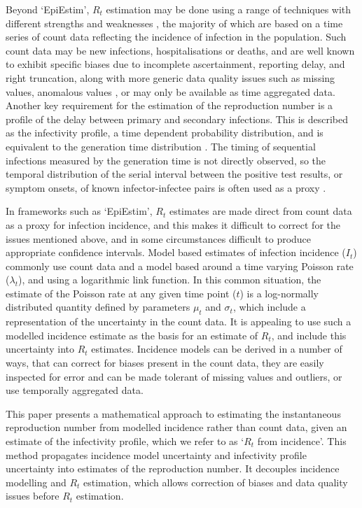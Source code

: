 \documentclass[10pt,letterpaper]{article}
\begin{document}
Beyond `EpiEstim', $R_t$ estimation may be done using a range of techniques with different strengths and weaknesses \cite{abbott2024,alvarez2021,parag2021,thompson2019,wallinga2006,steyn2024,nash2023,nash2022,gressani2022,cauchemez2006,hong2020,johnson2021,ogi-gittins2024}, the majority of which are based on a time series of count data reflecting the incidence of infection in the population. Such count data may be new infections, hospitalisations or deaths, and are well known to exhibit specific biases due to incomplete ascertainment, reporting delay, and right truncation, along with more generic data quality issues such as missing values, anomalous values \cite{abbott2020}, or may only be available as time aggregated data. Another key requirement for the estimation of the reproduction number is a profile of the delay between primary and secondary infections. This is described as the infectivity profile, a time dependent probability distribution, and is equivalent to the generation time distribution \cite{gostic2020,park2021}. The timing of sequential infections measured by the generation time is not directly observed, so the temporal distribution of the serial interval between the positive test results, or symptom onsets, of known infector-infectee pairs is often used as a proxy \cite{park2021, thompson2019}. 

In frameworks such as `EpiEstim', $R_t$ estimates are made direct from count data as a proxy for infection incidence, and this makes it difficult to correct for the issues mentioned above, and in some circumstances difficult to produce appropriate confidence intervals. Model based estimates of infection incidence ($I_t$) commonly use count data and a model based around a time varying Poisson rate ($\lambda_t$), and using a logarithmic link function. In this common situation, the estimate of the Poisson rate at any given time point ($t$) is a log-normally distributed quantity defined by parameters $\mu_t$ and $\sigma_t$, which include a representation of the uncertainty in the count data. It is appealing to use such a modelled incidence estimate as the basis for an estimate of $R_t$, and include this uncertainty into $R_t$ estimates. Incidence models can be derived in a number of ways, that can correct for biases present in the count data, they are easily inspected for error and can be made tolerant of missing values and outliers, or use temporally aggregated data.

This paper presents a mathematical approach to estimating the instantaneous reproduction number from modelled incidence rather than count data, given an estimate of the infectivity profile, which we refer to as `$R_t$ from incidence'. This method propagates incidence model uncertainty and infectivity profile uncertainty into estimates of the reproduction number. It decouples incidence modelling and $R_t$ estimation, which allows correction of biases and data quality issues before $R_t$ estimation. 
\end{document}
